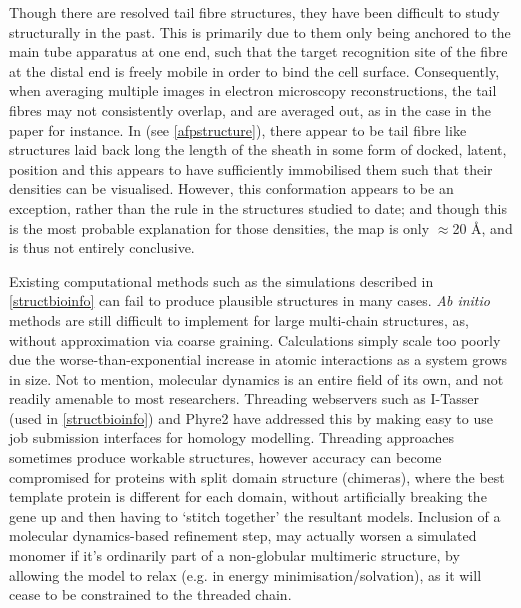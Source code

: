 Though there are resolved tail fibre structures, they have been difficult to study structurally in the past. This is primarily due to them only being anchored to the main tube apparatus at one end, such that the target recognition site of the fibre at the distal end is freely mobile in order to bind the cell surface. Consequently, when averaging multiple images in electron microscopy reconstructions, the tail fibres may not consistently overlap, and are averaged out, as in the case in the \citep{Ge2015a} paper for instance. In \cite{Heymann2013} (see \vref{afpstructure}), there appear to be tail fibre like structures laid back long the length of the sheath in some form of docked, latent, position and this appears to have sufficiently immobilised them such that their densities can be visualised. However, this conformation appears to be an exception, rather than the rule in the structures studied to date; and though this is the most probable explanation for those densities, the map is only $\approx$20 \AA, and is thus not entirely conclusive.

Existing computational methods such as the simulations described in \vref{structbioinfo} can fail to produce plausible structures in many cases. \emph{Ab initio} methods are still difficult to implement for large multi-chain structures, as, without approximation via coarse graining. Calculations simply scale too poorly due the worse-than-exponential increase in atomic interactions as a system grows in size. Not to mention, molecular dynamics is an entire field of its own, and not readily amenable to most researchers. Threading webservers such as I-Tasser \citep{Yang2014, Zhang2008, Roy2010} (used in \vref{structbioinfo}) and Phyre2 \citep{Kelly2015} have addressed this by making easy to use job submission interfaces for homology modelling. Threading approaches sometimes produce workable structures, however accuracy can become compromised for proteins with split domain structure (chimeras), where the best template protein is different for each domain, without artificially breaking the gene up and then having to `stitch together' the resultant models. Inclusion of a molecular dynamics-based refinement step, may actually worsen a simulated monomer if it's ordinarily part of a non-globular multimeric structure, by allowing the model to relax (e.g. in energy minimisation/solvation), as it will cease to be constrained to the threaded chain.

